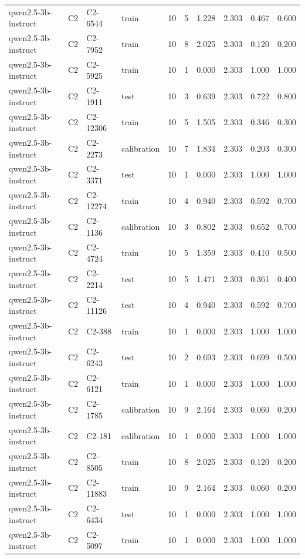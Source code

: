 \begin{table}
\begin{tabular}{llllrrrrrr}
qwen2.5-3b-instruct & C2 & C2-6544 & train & 10 & 5 & 1.228 & 2.303 & 0.467 & 0.600 \\
qwen2.5-3b-instruct & C2 & C2-7952 & train & 10 & 8 & 2.025 & 2.303 & 0.120 & 0.200 \\
qwen2.5-3b-instruct & C2 & C2-5925 & train & 10 & 1 & 0.000 & 2.303 & 1.000 & 1.000 \\
qwen2.5-3b-instruct & C2 & C2-1911 & test & 10 & 3 & 0.639 & 2.303 & 0.722 & 0.800 \\
qwen2.5-3b-instruct & C2 & C2-12306 & train & 10 & 5 & 1.505 & 2.303 & 0.346 & 0.300 \\
qwen2.5-3b-instruct & C2 & C2-2273 & calibration & 10 & 7 & 1.834 & 2.303 & 0.203 & 0.300 \\
qwen2.5-3b-instruct & C2 & C2-3371 & test & 10 & 1 & 0.000 & 2.303 & 1.000 & 1.000 \\
qwen2.5-3b-instruct & C2 & C2-12274 & train & 10 & 4 & 0.940 & 2.303 & 0.592 & 0.700 \\
qwen2.5-3b-instruct & C2 & C2-1136 & calibration & 10 & 3 & 0.802 & 2.303 & 0.652 & 0.700 \\
qwen2.5-3b-instruct & C2 & C2-4724 & train & 10 & 5 & 1.359 & 2.303 & 0.410 & 0.500 \\
qwen2.5-3b-instruct & C2 & C2-2214 & test & 10 & 5 & 1.471 & 2.303 & 0.361 & 0.400 \\
qwen2.5-3b-instruct & C2 & C2-11126 & test & 10 & 4 & 0.940 & 2.303 & 0.592 & 0.700 \\
qwen2.5-3b-instruct & C2 & C2-388 & train & 10 & 1 & 0.000 & 2.303 & 1.000 & 1.000 \\
qwen2.5-3b-instruct & C2 & C2-6243 & test & 10 & 2 & 0.693 & 2.303 & 0.699 & 0.500 \\
qwen2.5-3b-instruct & C2 & C2-6121 & train & 10 & 1 & 0.000 & 2.303 & 1.000 & 1.000 \\
qwen2.5-3b-instruct & C2 & C2-1785 & calibration & 10 & 9 & 2.164 & 2.303 & 0.060 & 0.200 \\
qwen2.5-3b-instruct & C2 & C2-181 & calibration & 10 & 1 & 0.000 & 2.303 & 1.000 & 1.000 \\
qwen2.5-3b-instruct & C2 & C2-8505 & train & 10 & 8 & 2.025 & 2.303 & 0.120 & 0.200 \\
qwen2.5-3b-instruct & C2 & C2-11883 & train & 10 & 9 & 2.164 & 2.303 & 0.060 & 0.200 \\
qwen2.5-3b-instruct & C2 & C2-6434 & test & 10 & 1 & 0.000 & 2.303 & 1.000 & 1.000 \\
qwen2.5-3b-instruct & C2 & C2-5097 & train & 10 & 1 & 0.000 & 2.303 & 1.000 & 1.000 \\

\end{tabular}
\end{table}
